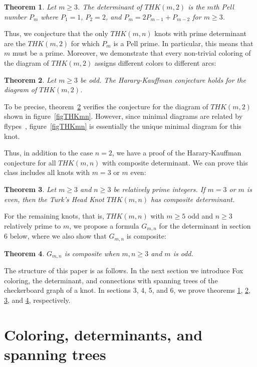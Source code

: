 \documentclass{amsart}
\newtheorem{thm}{Theorem}
\begin{document}
\begin{thm} 
\label{thmdetm2}Let $m \geq 3$. The determinant of $THK(m,2)$ is the $m$th Pell number $P_m$ where $P_1 = 1$, $P_2 = 2$, and $P_m = 2P_{m-1} + P_{m-2}$ for $m \geq 3$.
\end{thm}

Thus, we conjecture that the only $THK(m,n)$ knots with prime determinant
are the $THK(m,2)$ for which $P_m$ is a Pell prime. In particular, this means that $m$ must be a prime. 
Moreover, we demonstrate that every non-trivial coloring of the diagram of $THK(m,2)$ assigns different colors to different arcs:

\begin{thm}
\label{thmKHm2}Let $m \geq 3$ be odd. The Harary-Kauffman conjecture holds for the diagram of $THK(m,2)$.
\end{thm}

To be precise,
theorem~\ref{thmKHm2} verifies the conjecture for the diagram of $THK(m,2)$ shown in figure~\ref{figTHKmn}. However, since minimal diagrams are related  by flypes~\cite{MT}, figure~\ref{figTHKmn} is essentially the unique minimal diagram for this knot.

Thus, in addition to the case $n=2$,
we have a proof of the Harary-Kauffman conjecture for all $THK(m,n)$ 
with composite determinant. We can prove this class includes all knots
with $m=3$ or $m$ even:

\begin{thm}
\label{thmdet}Let $m \geq 3$ and $n \geq 3$ be relatively prime integers.
If $m = 3$ or $m$ is even, then the Turk's Head Knot $THK(m,n)$ 
has composite determinant.
\end{thm}

For the remaining knots, that is, $THK(m,n)$ with $m \geq 5$ odd and
$n \geq 3$ relatively prime to $m$, 
we propose a formula $G_{m,n}$ for the determinant in section 6 below,
where we also show that $G_{m,n}$ is composite:

\begin{thm}
\label{thmGmn}$G_{m,n}$ is composite when $m,n \geq 3$ and $m$ is odd. 
\end{thm}

The structure of this paper is as follows. In the next section we introduce Fox coloring, the determinant, and connections with spanning trees of the
checkerboard graph of a knot. In sections 3, 4, 5, and 6, we prove theorems \ref{thmdetm2}, \ref{thmKHm2}, \ref{thmdet}, and \ref{thmGmn}, respectively.

\section{Coloring, determinants, and spanning trees}
\end{document}
